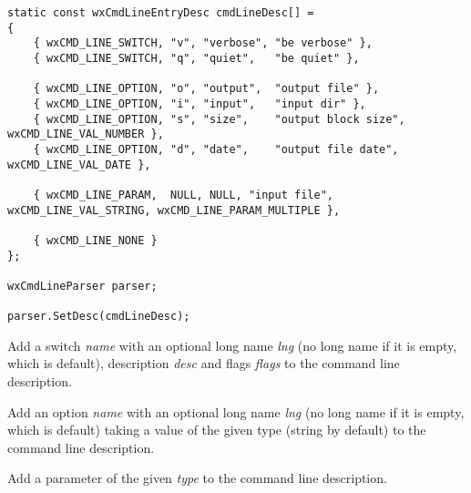 \begin{verbatim}
static const wxCmdLineEntryDesc cmdLineDesc[] =
{
    { wxCMD_LINE_SWITCH, "v", "verbose", "be verbose" },
    { wxCMD_LINE_SWITCH, "q", "quiet",   "be quiet" },

    { wxCMD_LINE_OPTION, "o", "output",  "output file" },
    { wxCMD_LINE_OPTION, "i", "input",   "input dir" },
    { wxCMD_LINE_OPTION, "s", "size",    "output block size", wxCMD_LINE_VAL_NUMBER },
    { wxCMD_LINE_OPTION, "d", "date",    "output file date", wxCMD_LINE_VAL_DATE },

    { wxCMD_LINE_PARAM,  NULL, NULL, "input file", wxCMD_LINE_VAL_STRING, wxCMD_LINE_PARAM_MULTIPLE },

    { wxCMD_LINE_NONE }
};

wxCmdLineParser parser;

parser.SetDesc(cmdLineDesc);
\end{verbatim}

\label{wxcmdlineparseraddswitch}


Add a switch {\it name} with an optional long name {\it lng} (no long name if it
is empty, which is default), description {\it desc} and flags {\it flags} to the
command line description.

\label{wxcmdlineparseraddoption}


Add an option {\it name} with an optional long name {\it lng} (no long name if
it is empty, which is default) taking a value of the given type (string by
default) to the command line description.

\label{wxcmdlineparseraddparam}


Add a parameter of the given {\it type} to the command line description.

